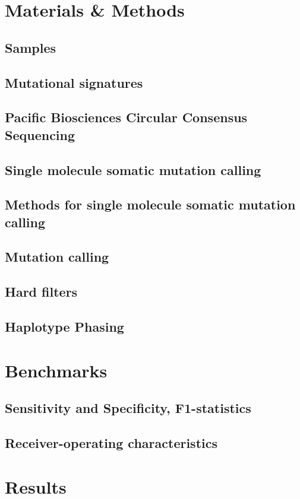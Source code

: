 \section{Materials \& Methods}
\subsection{Samples}
\subsection{Mutational signatures}
\subsection{Pacific Biosciences Circular Consensus Sequencing}


\subsection{Single molecule somatic mutation calling}
\subsection{Methods for single molecule somatic mutation calling}
\subsection{Mutation calling}
\subsection{Hard filters}
\subsection{Haplotype Phasing}
\section{Benchmarks}
\subsection{Sensitivity and Specificity, F1-statistics}
\subsection{Receiver-operating characteristics}
\section{Results}
